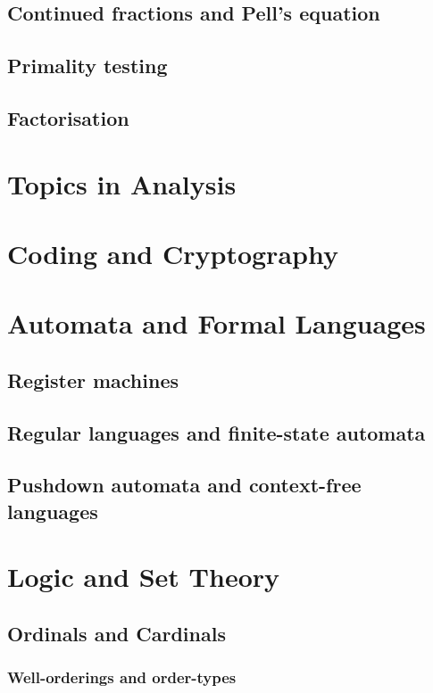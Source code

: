 \documentclass[12pt]{book}
\theoremstyle{definition}
\theoremstyle{remark}
\begin{document}
		\section{Continued fractions and Pell's equation}
		
		\section{Primality testing}
		
		\section{Factorisation}
	\chapter{Topics in Analysis}
	
	
	\chapter{Coding and Cryptography}
	
	\chapter{Automata and Formal Languages}
		\section{Register machines}
		
		\section{Regular languages and finite-state automata}
		
		\section{Pushdown automata and context-free languages}
	\chapter{Logic and Set Theory}
		\section{Ordinals and Cardinals}
			\subsection{Well-orderings and order-types}
			
\end{document}

